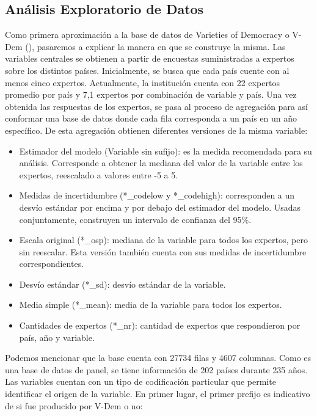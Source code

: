 \documentclass{article}
\begin{document}
\subsection{Análisis Exploratorio de Datos}
Como primera aproximación a la base de datos de Varieties of Democracy o V-Dem 
(\cite{CopMet24}), pasaremos a explicar la manera en que se construye la misma. Las
variables centrales se obtienen a partir de encuestas suministradas a expertos
sobre los distintos países. Inicialmente, se busca que cada país cuente con al menos
cinco expertos. Actualmente, la institución cuenta con 22 expertos promedio por país
y 7,1 expertos por combinación de variable y país. Una vez obtenida las respuestas
de los expertos, se pasa al proceso de agregación para así conformar una base de 
datos donde cada fila corresponda a un país en un año específico. De esta agregación
obtienen diferentes versiones de la misma variable:

\begin{itemize}
 \item Estimador del modelo (Variable sin sufijo): es la medida
  recomendada para su análisis. Corresponde a obtener la mediana del valor de 
  la variable entre los expertos, reescalado a valores entre -5 a 5.
 \item Medidas de incertidumbre (*\_codelow y *\_codehigh): corresponden a un 
 desvío estándar por encima y por debajo del estimador del modelo. 
 Usadas conjuntamente, construyen un intervalo de confianza del 95\%.
 \item Escala original (*\_osp): mediana de la variable para todos los expertos, pero sin 
 reescalar. Esta versión también cuenta con sus medidas de incertidumbre correspondientes.
 \item Desvío estándar (*\_sd): desvío estándar de la variable.
 \item Media simple (*\_mean): media de la variable para todos los expertos.
 \item Cantidades de expertos (*\_nr): cantidad de expertos que respondieron por
 país, año y variable.
\end{itemize}

Podemos mencionar que la base cuenta con 27734 filas y 4607 columnas. Como es una 
base de datos de panel, se tiene información de 202 países durante 235 años. Las 
variables cuentan con un tipo de codificación particular que permite identificar el 
origen de la variable. En primer lugar, el primer prefijo es indicativo de si fue 
producido por V-Dem o no:
\end{document}
